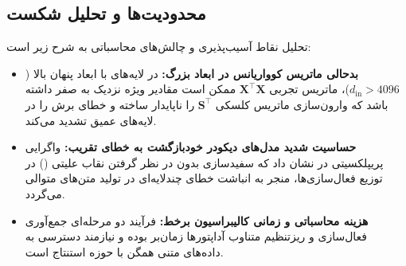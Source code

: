 \subsection{محدودیت‌ها و تحلیل شکست}
تحلیل نقاط آسیب‌پذیری و چالش‌های محاسباتی  به شرح زیر است:
\begin{itemize}
    \item \textbf{بدحالی ماتریس کوواریانس در ابعاد بزرگ:} در لایه‌های با ابعاد پنهان بالا ($d_{\text{in}} > 4096$)، ماتریس تجربی $\mathbf{X}^\top \mathbf{X}$ ممکن است مقادیر ویژه نزدیک به صفر داشته باشد که وارون‌سازی ماتریس کلسکی $\mathbf{S}^\top$ را ناپایدار ساخته و خطای برش را در لایه‌های عمیق تشدید می‌کند.
    \item \textbf{حساسیت شدید مدل‌های دیکودر خودبازگشت به خطای تقریب:} واگرایی پریپلکسیتی در  نشان داد که سفیدسازی بدون در نظر گرفتن نقاب علیتی () در توزیع فعال‌سازی‌ها، منجر به انباشت خطای چندلایه‌ای در تولید متن‌های متوالی می‌گردد.
    \item \textbf{هزینه محاسباتی و زمانی کالیبراسیون برخط:} فرآیند دو مرحله‌ای جمع‌آوری فعال‌سازی و ریزتنظیم متناوب آداپتورها زمان‌بر بوده و نیازمند دسترسی به داده‌های متنی همگن با حوزه استنتاج است.
\end{itemize}
